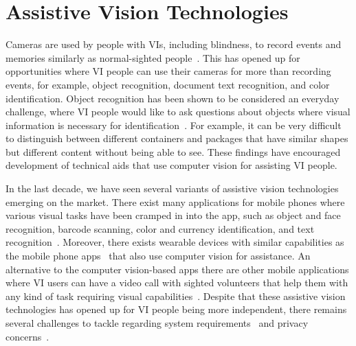 


\section{Assistive Vision Technologies}\label{sec:assistive_vision} %

Cameras are used by people with VIs, including blindness, to record events and memories similarly as normal-sighted people~\cite{jayant2011supporting}. This has opened up for opportunities where VI people can use their cameras for more than recording events, for example, object recognition, document text recognition, and color identification. Object recognition has been shown to be considered an everyday challenge, where VI people would like to ask questions about objects where visual information is necessary for identification~\cite{brady2013visual}. For example, it can be very difficult to distinguish between different containers and packages that have similar shapes but different content without being able to see. These findings have encouraged development of technical aids that use computer vision for assisting VI people. 

In the last decade, we have seen several variants of assistive vision technologies emerging on the market. There exist many applications for mobile phones where various visual tasks have been cramped in into the app, such as object and face recognition, barcode scanning, color and currency identification, and text recognition~\cite{microsoft2017seeing, clary2018lookout, cloudsight2013taptapsee, envision2018app}. Moreover, there exists wearable devices with similar capabilities as the mobile phone apps~\cite{orcam2019myeye, envision2020glasses} that also use computer vision for assistance. An alternative to the computer vision-based apps there are other mobile applications where VI users can have a video call with sighted volunteers that help them with any kind of task requiring visual capabilities~\cite{bemyeyes2017be, aira2017aira}. Despite that these assistive vision technologies has opened up for VI people being more independent, there remains several challenges to tackle regarding system requirements~\cite{chiu2020assessing, kacorri2017people, pellegrini2019latent} %
and privacy concerns~\cite{ahmed2015privacy, gurari2019vizwiz, hoyle2014privacy}.

